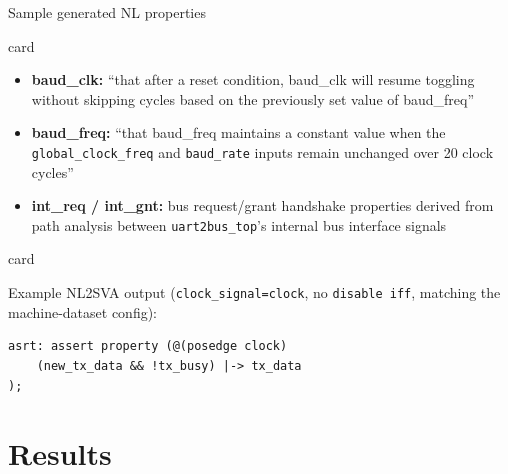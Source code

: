\documentclass[aspectratio=169]{beamer}
\newenvironment{card}[1][\textwidth]{%
  \begin{beamercolorbox}[wd=#1,sep=8pt,rounded=true,shadow=false]{card}
}{%
  \end{beamercolorbox}
}
\begin{document}
\begin{frame}[fragile]{Sample generated NL properties}
  \begin{card}
  \scriptsize
  \begin{itemize}
    \item \textbf{baud\_clk:} ``that after a reset condition, baud\_clk will
      resume toggling without skipping cycles based on the previously set
      value of baud\_freq''
    \item \textbf{baud\_freq:} ``that baud\_freq maintains a constant value
      when the \texttt{global\_clock\_freq} and \texttt{baud\_rate} inputs
      remain unchanged over 20 clock cycles''
    \item \textbf{int\_req / int\_gnt:} bus request/grant handshake
      properties derived from path analysis between \texttt{uart2bus\_top}'s
      internal bus interface signals
  \end{itemize}
  \end{card}
  \vspace{10pt}
  \begin{card}
  \footnotesize
  Example NL2SVA output (\texttt{clock\_signal=clock}, no \texttt{disable iff},
  matching the machine-dataset config):
  \begin{verbatim}
asrt: assert property (@(posedge clock)
    (new_tx_data && !tx_busy) |-> tx_data
);
  \end{verbatim}
  \end{card}
\end{frame}

\section{Results}
\end{document}
